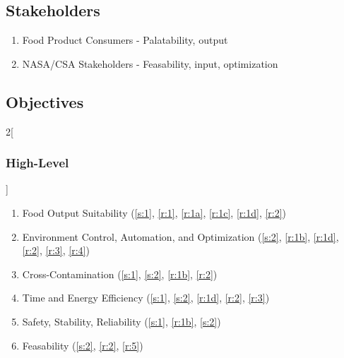 \documentclass{report}
\begin{document}
\subsection{Stakeholders}
\label{sec:stakeholders}

\begin{enumerate}[label=S\arabic*., ref=S\arabic*]
    \item \label{s:1} Food Product Consumers - Palatability, output
    \item \label{s:2} NASA/CSA Stakeholders - Feasability, input, optimization
\end{enumerate}

\subsection{Objectives}
\label{sec:objectives}

\begin{multicols}{2}[\subsubsection{High-Level}\label{sec:hlos}]
    \begin{enumerate}[label=HL\arabic*., ref=HL\arabic*]
        \item \label{hl:output} Food Output Suitability \hfill (\ref{s:1}, \ref{r:1}, \ref{r:1a}, \ref{r:1c}, \ref{r:1d}, \ref{r:2})
        \item \label{hl:environment} Environment Control, Automation, and Optimization \hfill (\ref{s:2}, \ref{r:1b}, \ref{r:1d}, \ref{r:2}, \ref{r:3}, \ref{r:4})
        \item \label{hl:contamination} Cross-Contamination \hfill (\ref{s:1}, \ref{s:2}, \ref{r:1b}, \ref{r:2})
        \item \label{hl:efficiency} Time and Energy Efficiency \hfill (\ref{s:1}, \ref{s:2}, \ref{r:1d}, \ref{r:2}, \ref{r:3})
        \item \label{hl:safety} Safety, Stability, Reliability \hfill (\ref{s:1}, \ref{r:1b}, \ref{s:2})
        \item \label{hl:feasability} Feasability \hfill (\ref{s:2}, \ref{r:2}, \ref{r:5})
    \end{enumerate}
\end{multicols}
\end{document}

